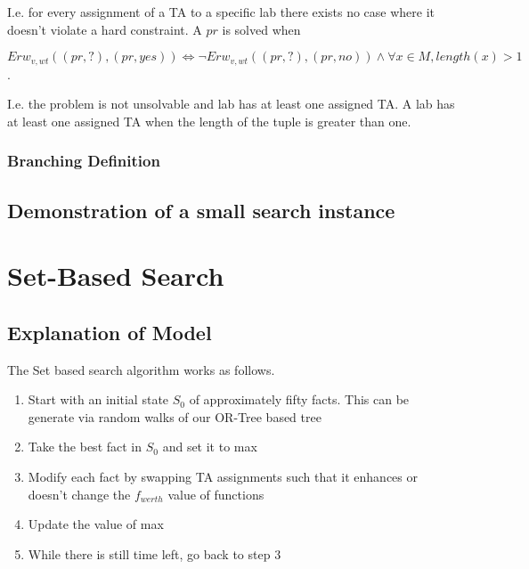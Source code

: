 \documentclass{article}
\begin{document}
I.e. for every assignment of a TA to a specific lab there exists no
case where it doesn't violate a hard constraint. A $pr$ is solved when\\

\begin{center}
  $Erw_{v,wt}((pr, ?),(pr, yes)) \iff \lnot Erw_{v,wt}((pr, ?),(pr,
  no)) \land \forall x \in M, length(x) > 1$.
\end{center}

I.e. the problem is not unsolvable and lab has at least one assigned
TA. A lab has at least one assigned TA when the length of the tuple is
greater than one.

\subsubsection{Branching Definition}


\subsection{Demonstration of a small search instance}

\section{Set-Based Search}

\subsection{Explanation of Model}

The Set based search algorithm works as follows.

\begin{enumerate}

\item Start with an initial state $S_0$ of approximately fifty facts.
  This can be generate via random walks of our OR-Tree based tree

\item Take the best fact in $S_0$ and set it to max

\item Modify each fact by swapping TA assignments such that it
  enhances or doesn't change the $f_{werth}$ value of functions

\item Update the value of max

\item While there is still time left, go back to step 3


\end{enumerate}
\end{document}
